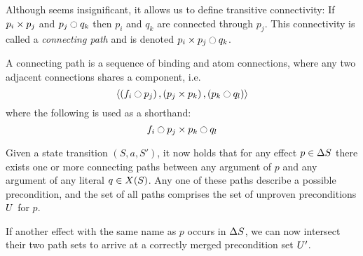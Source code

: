 \documentclass[\master/Master.tex]{subfiles}
\begin{document}
Although  seems insignificant, it allows us to define transitive connectivity: If $p_i \times p_j$ and $p_j \ocircle q_k$ then $p_i$ and $q_k$ are connected through $p_j$. This connectivity is called a \emph{connecting path} and is denoted $p_i \times p_j \ocircle q_k$.

\begin{definition}\label{def:ca:connectingPath}
    A connecting path is a sequence of binding and atom connections, where any two adjacent connections shares a component, i.e.\
    \begin{equation*}
        \left< 
            \left( f_i \ocircle p_j \right), 
            \left( p_j \times p_k \right), 
            \left( p_k \ocircle q_l \right) 
        \right>
    \end{equation*}
    where the following is used as a shorthand:
    \begin{equation*}
        f_i \ocircle p_j \times p_k \ocircle q_l
    \end{equation*}
\end{definition}



Given a state transition $\left(S, a, S'\right)$, it now holds that for any effect $p \in \Delta S$ there exists one or more connecting paths between any argument of $p$ and any argument of any literal $q \in X(S)$. Any one of these paths describe a possible precondition, and the set of all paths comprises the set of unproven preconditions $U$ for $p$. 

If another effect with the same name as $p$ occurs in $\Delta S$, we can now intersect their two path sets to arrive at a correctly merged precondition set $U'$.
\end{document}
